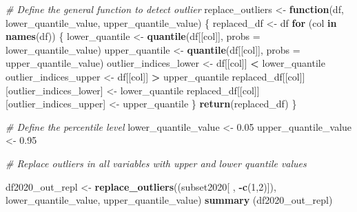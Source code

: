 \documentclass[
]{article}
\newenvironment{Shaded}{\begin{snugshade}}{\end{snugshade}}
\newcommand{\AttributeTok}[1]{\textcolor[rgb]{0.13,0.29,0.53}{#1}}
\newcommand{\CommentTok}[1]{\textcolor[rgb]{0.56,0.35,0.01}{\textit{#1}}}
\newcommand{\ControlFlowTok}[1]{\textcolor[rgb]{0.13,0.29,0.53}{\textbf{#1}}}
\newcommand{\DecValTok}[1]{\textcolor[rgb]{0.00,0.00,0.81}{#1}}
\newcommand{\FloatTok}[1]{\textcolor[rgb]{0.00,0.00,0.81}{#1}}
\newcommand{\FunctionTok}[1]{\textcolor[rgb]{0.13,0.29,0.53}{\textbf{#1}}}
\newcommand{\NormalTok}[1]{#1}
\newcommand{\OtherTok}[1]{\textcolor[rgb]{0.56,0.35,0.01}{#1}}
\newcommand{\SpecialCharTok}[1]{\textcolor[rgb]{0.81,0.36,0.00}{\textbf{#1}}}
\begin{document}
\begin{Shaded}
\begin{Highlighting}[]
\CommentTok{\# Define the general function to detect outlier}
\NormalTok{replace\_outliers }\OtherTok{\textless{}{-}} \ControlFlowTok{function}\NormalTok{(df, lower\_quantile\_value, upper\_quantile\_value) \{}
\NormalTok{  replaced\_df }\OtherTok{\textless{}{-}}\NormalTok{ df}
  \ControlFlowTok{for}\NormalTok{ (col }\ControlFlowTok{in} \FunctionTok{names}\NormalTok{(df)) \{}
\NormalTok{    lower\_quantile }\OtherTok{\textless{}{-}} \FunctionTok{quantile}\NormalTok{(df[[col]], }\AttributeTok{probs =}\NormalTok{ lower\_quantile\_value)}
\NormalTok{    upper\_quantile }\OtherTok{\textless{}{-}} \FunctionTok{quantile}\NormalTok{(df[[col]], }\AttributeTok{probs =}\NormalTok{ upper\_quantile\_value)}
\NormalTok{    outlier\_indices\_lower }\OtherTok{\textless{}{-}}\NormalTok{ df[[col]] }\SpecialCharTok{\textless{}}\NormalTok{ lower\_quantile}
\NormalTok{    outlier\_indices\_upper }\OtherTok{\textless{}{-}}\NormalTok{ df[[col]] }\SpecialCharTok{\textgreater{}}\NormalTok{ upper\_quantile}
\NormalTok{    replaced\_df[[col]][outlier\_indices\_lower] }\OtherTok{\textless{}{-}}\NormalTok{ lower\_quantile}
\NormalTok{    replaced\_df[[col]][outlier\_indices\_upper] }\OtherTok{\textless{}{-}}\NormalTok{ upper\_quantile}
\NormalTok{  \}}
  \FunctionTok{return}\NormalTok{(replaced\_df)}
\NormalTok{\}}

\CommentTok{\# Define the percentile level}
\NormalTok{lower\_quantile\_value }\OtherTok{\textless{}{-}} \FloatTok{0.05}
\NormalTok{upper\_quantile\_value }\OtherTok{\textless{}{-}} \FloatTok{0.95}

\CommentTok{\# Replace outliers in all variables with upper and lower quantile values}

\NormalTok{df2020\_out\_repl }\OtherTok{\textless{}{-}} \FunctionTok{replace\_outliers}\NormalTok{((subset2020[ , }\SpecialCharTok{{-}}\FunctionTok{c}\NormalTok{(}\DecValTok{1}\NormalTok{,}\DecValTok{2}\NormalTok{)]), lower\_quantile\_value, upper\_quantile\_value)}
\FunctionTok{summary}\NormalTok{ (df2020\_out\_repl)}
\end{Highlighting}
\end{Shaded}
\end{document}
